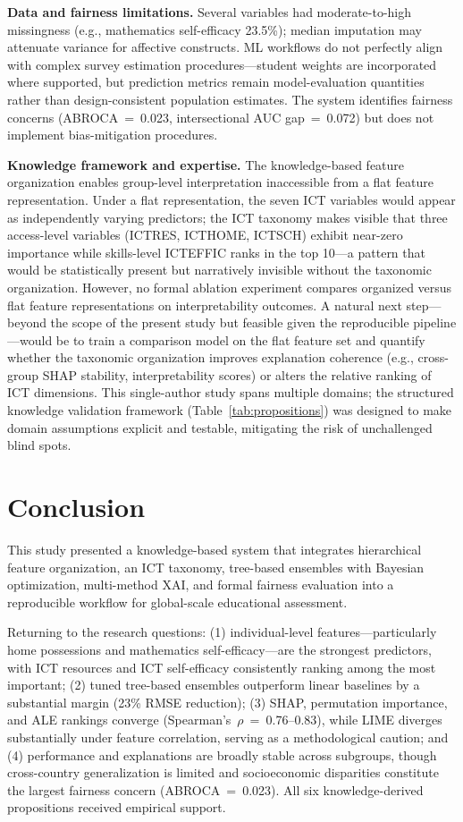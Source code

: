 \documentclass[review,12pt]{elsarticle}
\begin{document}
\textbf{Data and fairness limitations.}
Several variables had moderate-to-high missingness (e.g., mathematics self-efficacy 23.5\%); median imputation may attenuate variance for affective constructs. ML workflows do not perfectly align with complex survey estimation procedures---student weights are incorporated where supported, but prediction metrics remain model-evaluation quantities rather than design-consistent population estimates. The system identifies fairness concerns (ABROCA~=~0.023, intersectional AUC gap~=~0.072) but does not implement bias-mitigation procedures.

\textbf{Knowledge framework and expertise.}
The knowledge-based feature organization enables group-level interpretation inaccessible from a flat feature representation. Under a flat representation, the seven ICT variables would appear as independently varying predictors; the ICT taxonomy makes visible that three access-level variables (ICTRES, ICTHOME, ICTSCH) exhibit near-zero importance while skills-level ICTEFFIC ranks in the top 10---a pattern that would be statistically present but narratively invisible without the taxonomic organization. However, no formal ablation experiment compares organized versus flat feature representations on interpretability outcomes. A natural next step---beyond the scope of the present study but feasible given the reproducible pipeline---would be to train a comparison model on the flat feature set and quantify whether the taxonomic organization improves explanation coherence (e.g., cross-group SHAP stability, interpretability scores) or alters the relative ranking of ICT dimensions. This single-author study spans multiple domains; the structured knowledge validation framework (Table~\ref{tab:propositions}) was designed to make domain assumptions explicit and testable, mitigating the risk of unchallenged blind spots.

\section{Conclusion}

This study presented a knowledge-based system that integrates hierarchical feature organization, an ICT taxonomy, tree-based ensembles with Bayesian optimization, multi-method XAI, and formal fairness evaluation into a reproducible workflow for global-scale educational assessment.

Returning to the research questions: (1) individual-level features---particularly home possessions and mathematics self-efficacy---are the strongest predictors, with ICT resources and ICT self-efficacy consistently ranking among the most important; (2) tuned tree-based ensembles outperform linear baselines by a substantial margin (23\% RMSE reduction); (3) SHAP, permutation importance, and ALE rankings converge (Spearman's~$\rho$~=~0.76--0.83), while LIME diverges substantially under feature correlation, serving as a methodological caution; and (4) performance and explanations are broadly stable across subgroups, though cross-country generalization is limited and socioeconomic disparities constitute the largest fairness concern (ABROCA~=~0.023). All six knowledge-derived propositions received empirical support.
\end{document}
